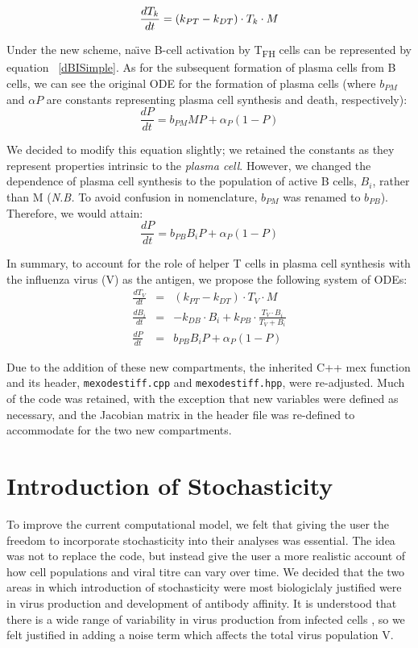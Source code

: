 \documentclass[a4paper, 12pt]{report}
\begin{document}
\begin{equation}
\frac{dT_k}{dt} = (k_{PT}-k_{DT}) \cdot T_k \cdot M \\
\end{equation}

Under the new scheme, na\"\i ve B-cell activation by T\textsubscript{FH} cells can be represented by equation ~\ref{dBISimple}. As for the subsequent formation of plasma cells from B cells, we can see the original ODE for the formation of plasma cells (where $b_{PM}$ and $\alpha{P}$ are constants representing plasma cell synthesis and death, respectively):
\begin{equation}
\frac{dP}{dt} = b_{PM}MP + \alpha_{P}(1 - P)
\end{equation}

We decided to modify this equation slightly; we retained the constants as they represent properties intrinsic to the \emph{plasma cell}. However, we changed the dependence of plasma cell synthesis to the population of active B cells, $B_{i}$, rather than M (\emph{N.B. }To avoid confusion in nomenclature, $b_{PM}$ was renamed to $b_{PB}$). Therefore, we would attain:
\begin{equation}
\frac{dP}{dt} = b_{PB}B_{i}P + \alpha_{P}(1 - P)
\end{equation}

In summary, to account for the role of helper T cells in plasma cell synthesis with the influenza virus (V) as the antigen, we propose the following system of ODEs:
\begin{eqnarray*}
\frac{dT_V}{dt} &=& (k_{PT}-k_{DT}) \cdot T_V \cdot M \\
\frac{dB_i}{dt} &=& -k_{DB} \cdot B_i + k_{PB} \cdot \frac{T_{V} \cdot B_{i}}{T_{V}+B_{i}} \\
\frac{dP}{dt} &=& b_{PB}B_{i}P + \alpha_{P}(1 - P)
\end{eqnarray*}

Due to the addition of these new compartments, the inherited C++ mex function and its header, \texttt{mexodestiff.cpp} and \texttt{mexodestiff.hpp}, were re-adjusted. Much of the code was retained, with the exception that new variables were defined as necessary, and the Jacobian matrix in the header file was re-defined to accommodate for the two new compartments.

\section{Introduction of Stochasticity} %
To improve the current computational model, we felt that giving the user the freedom to incorporate stochasticity into their analyses was essential. The idea was not to replace the code, but instead give the user a more realistic account of how cell populations and viral titre can vary over time. We decided that the two areas in which introduction of stochasticity were most biologiclaly justified were in virus production and development of antibody affinity. It is understood that there is a wide range of variability in virus production from infected cells \cite{MitchellJanuary152011}, so we felt justified in adding a noise term which affects the total virus population V.\\
\end{document}
